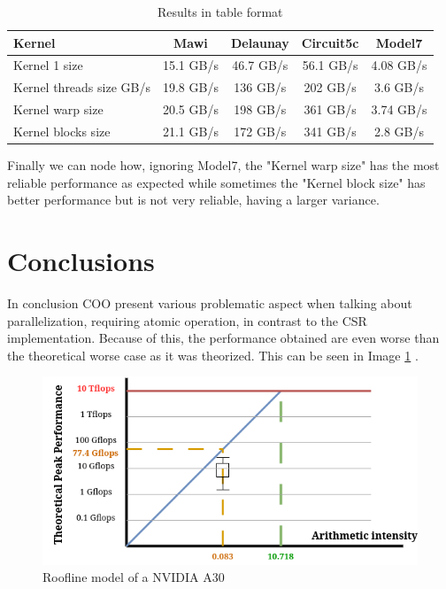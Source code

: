 \documentclass[conference]{IEEEtran}
\begin{document}
\begin{table}[hbt!]
	\centering
	\begin{adjustbox}{width=\columnwidth}
		\begin{tabular}{lcccc}
			\toprule
			\textbf{Kernel} & \textbf{Mawi} & \textbf{Delaunay} & \textbf{Circuit5c} & \textbf{Model7}\\
			\midrule
			Kernel 1 size & 15.1 GB/s & 46.7 GB/s & 56.1 GB/s & 4.08 GB/s\\
			Kernel threads size GB/s & 19.8 GB/s & 136 GB/s & 202 GB/s & 3.6 GB/s\\
			Kernel warp size & 20.5 GB/s & 198 GB/s & 361 GB/s & 3.74 GB/s\\
			Kernel blocks size & 21.1 GB/s & 172 GB/s & 341 GB/s & 2.8 GB/s\\
			\bottomrule
		\end{tabular}
	\end{adjustbox}
	\vspace{1em}

	\caption{Results in table format}
	\label{tab:gpu-results}
\end{table}

\FloatBarrier

Finally we can node how, ignoring Model7, the "Kernel warp size" has the most reliable performance as expected while sometimes the "Kernel block size" has better performance but is not very reliable, having a larger variance.


\section{Conclusions}
In conclusion COO present various problematic aspect when talking about parallelization, requiring atomic operation, in contrast to the CSR implementation. Because of this, the performance obtained are even worse than the theoretical worse case as it was theorized. This can be seen in Image \ref{fig:roofline} .

\begin{figure}[hbt!]
	\centering
	\includegraphics[width=1\linewidth]{data_images/roofline}
	\caption{Roofline model of a NVIDIA A30}
	\label{fig:roofline}
\end{figure}
\end{document}
